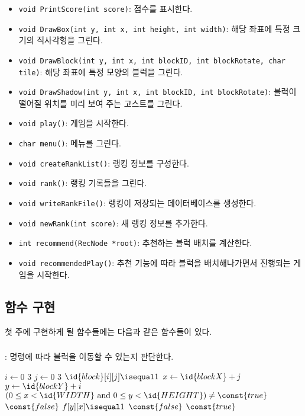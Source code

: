 \begin{itemize}
    \item \texttt{void PrintScore(int score)}: 점수를 표시한다.
    \item \texttt{void DrawBox(int y, int x, int height, int width)}: 해당 좌표에 특정 크기의 직사각형을 그린다.
    \item \texttt{void DrawBlock(int y, int x, int blockID, int blockRotate, char tile)}: 해당 좌표에 특정 모양의 블럭을 그린다.
    \item \texttt{void DrawShadow(int y, int x, int blockID, int blockRotate)}: 블럭이 떨어질 위치를 미리 보여 주는 고스트를 그린다.
    \item \texttt{void play()}: 게임을 시작한다.
    \item \texttt{char menu()}: 메뉴를 그린다.
    \item \texttt{void createRankList()}: 랭킹 정보를 구성한다.
    \item \texttt{void rank()}: 랭킹 기록들을 그린다.
    \item \texttt{void writeRankFile()}: 랭킹이 저장되는 데이터베이스를 생성한다.
    \item \texttt{void newRank(int score)}: 새 랭킹 정보를 추가한다.
    \item \texttt{int recommend(RecNode *root)}: 추천하는 블럭 배치를 계산한다.
    \item \texttt{void recommendedPlay()}: 추천 기능에 따라 블럭을 배치해나가면서 진행되는 게임을 시작한다.
\end{itemize}

\subsection{함수 구현}
첫 주에 구현하게 될 함수들에는 다음과 같은 함수들이 있다.

\subsubsection{}: 명령에 따라 블럭을 이동할 수 있는지 판단한다.

\begin{codebox}
\li \For $i \gets 0$ \To $3$
\li \Do
        \For $j \gets 0$ \To $3$
\li     \Do
            \If $\id{block}[i][j] \isequal 1$
\li         \Then
                $x \gets \id{blockX} + j$
\li             $y \gets \id{blockY} + i$
\li             \If $\left( 0 \leq x < \id{WIDTH} \mbox{ and } 0 \leq y < \id{HEIGHT} \right) \neq \const{true}$
\li                 \Then \Return $\const{false}$
                \End
\li             \If $f[y][x] \isequal 1$
\li                 \Then \Return $\const{false}$
                \End
            \End
        \End
    \End
\li \Return $\const{true}$
\end{codebox}


